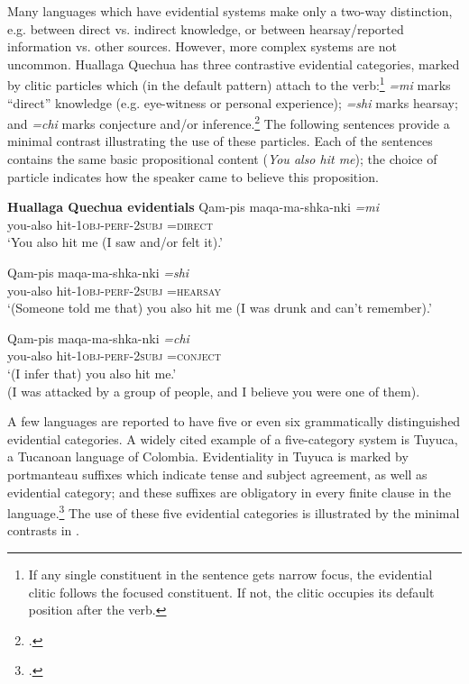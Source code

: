 Many languages which have evidential systems make only a two-way distinction, e.g. between direct vs. indirect knowledge, or between hearsay/reported information vs. other sources. However, more complex systems are not uncommon. Huallaga Quechua has three contrastive evidential categories, marked by clitic particles which (in the default pattern) attach to the verb:\footnote{If any single constituent in the sentence gets narrow focus, the evidential clitic follows the focused constituent. If not, the clitic occupies its default position after the verb.} \textit{=mi} marks “direct” knowledge (e.g. eye-witness or personal experience); \textit{=shi} marks hearsay; and \textit{=chi} marks conjecture and/or inference.\footnote{\citet{Weber1989}.} The following sentences provide a minimal contrast illustrating the use of these particles. Each of the sentences contains the same basic propositional content (\textit{You also hit me}); the choice of particle indicates how the speaker came to believe this proposition.


\ea

  \textbf{Huallaga Quechua evidentials} \citep[421]{Weber1989}
\ea
\gll Qam-pis  maqa-ma-shka-nki  \textit{=mi}\\
you-also  hit-1\textsc{obj}-\textsc{perf-2subj  =direct}\\
\glt ‘You also hit me (I saw and/or felt it).’

\ex \gll Qam-pis  maqa-ma-shka-nki  \textit{=shi}\\
you-also  hit-1\textsc{obj}-\textsc{perf-2subj  =hearsay}\\
\glt ‘(Someone told me that) you also hit me (I was drunk and can’t remember).’

 \ex \gll Qam-pis  maqa-ma-shka-nki  \textit{=chi}\\
you-also  hit-1\textsc{obj}-\textsc{perf-2subj  =conject}\\
\glt ‘(I infer that) you also hit me.’\\
(I was attacked by a group of people, and I believe you were one of them).
\z \z


A few languages are reported to have five or even six grammatically distinguished evidential categories. A widely cited example of a five-category system is Tuyuca, a Tucanoan language of Colombia. Evidentiality in Tuyuca is marked by portmanteau suffixes which indicate tense and subject agreement, as well as evidential category; and these suffixes are obligatory in every finite clause in the language.\footnote{\citet{Barnes1984}.} The use of these five evidential categories is illustrated by the minimal contrasts in .


